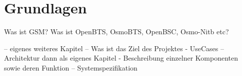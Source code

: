 \section{Grundlagen}
Was ist GSM?
Was ist OpenBTS, OsmoBTS, OpenBSC, Osmo-Nitb etc?

-- eigenes weiteres Kapitel
-- Was ist das Ziel des Projektes - UseCases \newline
-- Architektur dann als eigenes Kapitel - Beschreibung einzelner Komponenten sowie deren Funktion\newline
-- Systemspezifikation \newline